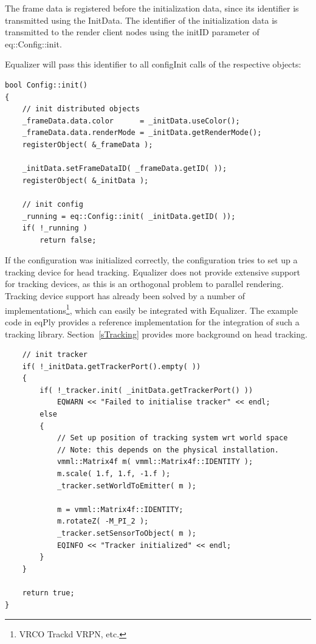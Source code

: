 \documentclass[10pt,a4]{scrartcl}
\newcommand{\sref}[1]{Section~\ref{#1}}
\begin{document}
The frame data is registered before the initialization data, since its
identifier is transmitted using the \textsf{InitData}. The identifier of
the initialization data is transmitted to the render client nodes using
the \textsf{initID} parameter of \textsf{eq::Config::init}.

Equalizer will pass this identifier to all \textsf{configInit} calls of
the respective objects:

{\footnotesize\begin{lstlisting}
bool Config::init()
{
    // init distributed objects
    _frameData.data.color      = _initData.useColor();
    _frameData.data.renderMode = _initData.getRenderMode();
    registerObject( &_frameData );

    _initData.setFrameDataID( _frameData.getID( ));
    registerObject( &_initData );

    // init config
    _running = eq::Config::init( _initData.getID( ));
    if( !_running )
        return false;
\end{lstlisting}}

If the configuration was initialized correctly, the configuration tries
to set up a tracking device for head tracking. Equalizer does not
provide extensive support for tracking devices, as this is an orthogonal
problem to parallel rendering. Tracking device support has already been
solved by a number of implementations\footnote{VRCO Trackd VRPN, etc.},
which can easily be integrated with Equalizer. The example code in
\textsf{eqPly} provides a reference implementation for the integration
of such a tracking library. \sref{sTracking} provides more background on
head tracking.

{\footnotesize\begin{lstlisting}
    // init tracker
    if( !_initData.getTrackerPort().empty( ))
    {
        if( !_tracker.init( _initData.getTrackerPort() ))
            EQWARN << "Failed to initialise tracker" << endl;
        else
        {
            // Set up position of tracking system wrt world space
            // Note: this depends on the physical installation.
            vmml::Matrix4f m( vmml::Matrix4f::IDENTITY );
            m.scale( 1.f, 1.f, -1.f );
            _tracker.setWorldToEmitter( m );

            m = vmml::Matrix4f::IDENTITY;
            m.rotateZ( -M_PI_2 );
            _tracker.setSensorToObject( m );
            EQINFO << "Tracker initialized" << endl;
        }
    }

    return true;
}
\end{lstlisting}}%
\end{document}

